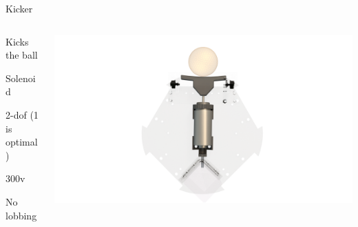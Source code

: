 
\begin{frame}{Kicker}

	\begin{columns}[T]
		\begin{column}{0.5\textwidth}

			\vspace{2cm}

            Kicks the ball

			Solenoid

			2-\ac{dof} (1 is optimal)

			$300$\:\acs{v}

            No lobbing

		\end{column}
		\begin{column}{0.5\textwidth}

			\begin{adjustbox}{scale=2,center,margin={-1cm,3cm,2cm,0cm}}
				\includegraphics[width=1\textwidth]{image/png/kicker_render.png}
			\end{adjustbox}

		\end{column}
	\end{columns}

\end{frame}

